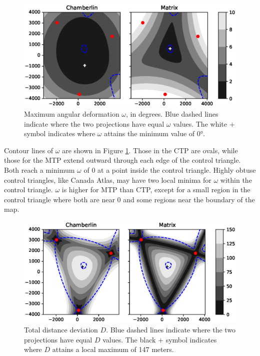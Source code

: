\documentclass[]{interact}
\begin{document}
\begin{figure}
  \includegraphics[width=\textwidth]{South_America_Wall_Map_omega}
  \caption{Maximum angular deformation $\omega$, in degrees. Blue dashed lines
  indicate where the two projections have equal $\omega$ values. The white
  $+$ symbol indicates where $\omega$ attains the minimum value of 0°.}
  \label{fig:angle}
\end{figure}

Contour lines of $\omega$ are shown in Figure \ref{fig:angle}. Those in the CTP
are ovals, while those for the MTP extend outward through each edge of the
control triangle. Both reach a minimum $\omega$ of 0 at a point inside the
control triangle. Highly obtuse control triangles, like Canada Atlas, may have
two local minima for $\omega$ within the control triangle. $\omega$ is higher
for MTP than CTP, except for a small region in the control triangle where both
are near 0 and some regions near the boundary of the map.

\begin{figure}
  \includegraphics[width=\textwidth]{South_America_Wall_Map_distance}
  \caption{Total distance deviation $D$. Blue dashed lines indicate where the
  two projections have equal $D$ values. The black $+$ symbol indicates where
  $D$ attains a local maximum of 147 meters.}
  \label{fig:distance}
\end{figure}
\end{document}
